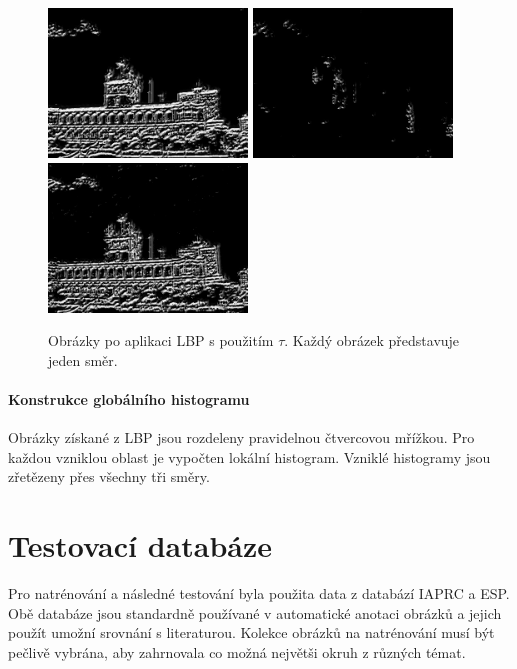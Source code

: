 \documentclass[czech,BP]{thesiskiv}
\begin{document}
\begin{figure}[H]
	\centering
	\includegraphics[width=150pt]{./img/lbp_3_1.jpg}
	\includegraphics[width=150pt]{./img/lbp_3_2.jpg}
	\includegraphics[width=150pt]{./img/lbp_3_3.jpg}
	\caption{Obrázky po aplikaci LBP s použitím $\tau$. Každý obrázek představuje jeden směr.}
\end{figure}

\subsubsection{Konstrukce globálního histogramu}
\par Obrázky získané z LBP jsou rozdeleny pravidelnou čtvercovou mřížkou. Pro každou vzniklou oblast je vypočten lokální histogram. Vzniklé histogramy jsou zřetězeny přes všechny tři směry.

\chapter{Testovací databáze}
\par Pro natrénování a následné testování byla použita data z databází IAPRC a ESP. Obě databáze jsou standardně používané v automatické anotaci obrázků a jejich použít umožní srovnání s literaturou. Kolekce obrázků na natrénování musí být pečlivě vybrána, aby zahrnovala co možná největši okruh z různých témat. 
\end{document}

